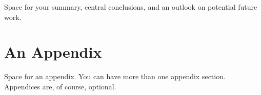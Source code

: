 \documentclass[a4paper,oneside,10pt,ngerman,english]{scrartcl}
\begin{document}
Space for your summary, central conclusions, and an outlook on potential future work.



\printbibliography

\appendix


\section{An Appendix}
\label{app:an-appendix}

Space for an appendix.
You can have more than one appendix section.
Appendices are, of course, optional.



\listoftables

\listoffigures



\cleardoubleoddpage
\end{document}
